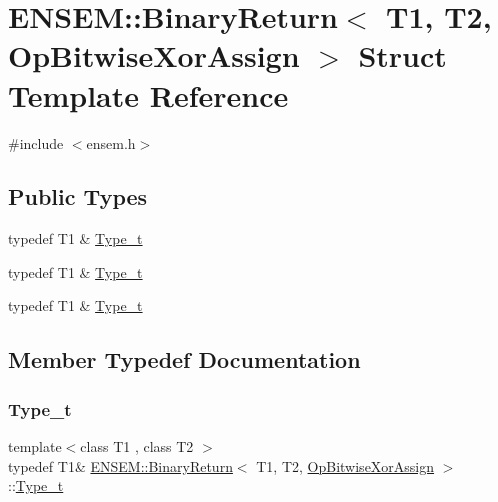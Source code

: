 \hypertarget{structENSEM_1_1BinaryReturn_3_01T1_00_01T2_00_01OpBitwiseXorAssign_01_4}{}\section{E\+N\+S\+EM\+:\+:Binary\+Return$<$ T1, T2, Op\+Bitwise\+Xor\+Assign $>$ Struct Template Reference}
\label{structENSEM_1_1BinaryReturn_3_01T1_00_01T2_00_01OpBitwiseXorAssign_01_4}


{\ttfamily \#include $<$ensem.\+h$>$}

\subsection*{Public Types}
\begin{DoxyCompactItemize}
\item 
typedef T1 \& \mbox{\hyperlink{structENSEM_1_1BinaryReturn_3_01T1_00_01T2_00_01OpBitwiseXorAssign_01_4_afa71b93b033427a13f9ffcbcb4ffb6dc}{Type\+\_\+t}}
\item 
typedef T1 \& \mbox{\hyperlink{structENSEM_1_1BinaryReturn_3_01T1_00_01T2_00_01OpBitwiseXorAssign_01_4_afa71b93b033427a13f9ffcbcb4ffb6dc}{Type\+\_\+t}}
\item 
typedef T1 \& \mbox{\hyperlink{structENSEM_1_1BinaryReturn_3_01T1_00_01T2_00_01OpBitwiseXorAssign_01_4_afa71b93b033427a13f9ffcbcb4ffb6dc}{Type\+\_\+t}}
\end{DoxyCompactItemize}


\subsection{Member Typedef Documentation}
\mbox{\label{structENSEM_1_1BinaryReturn_3_01T1_00_01T2_00_01OpBitwiseXorAssign_01_4_afa71b93b033427a13f9ffcbcb4ffb6dc}} 
\subsubsection{\texorpdfstring{Type\_t}{Type\_t}\hspace{0.1cm}{\footnotesize\ttfamily [1/3]}}
{\footnotesize\ttfamily template$<$class T1 , class T2 $>$ \\
typedef T1\& \mbox{\hyperlink{structENSEM_1_1BinaryReturn}{E\+N\+S\+E\+M\+::\+Binary\+Return}}$<$ T1, T2, \mbox{\hyperlink{structENSEM_1_1OpBitwiseXorAssign}{Op\+Bitwise\+Xor\+Assign}} $>$\+::\mbox{\hyperlink{structENSEM_1_1BinaryReturn_3_01T1_00_01T2_00_01OpBitwiseXorAssign_01_4_afa71b93b033427a13f9ffcbcb4ffb6dc}{Type\+\_\+t}}}

